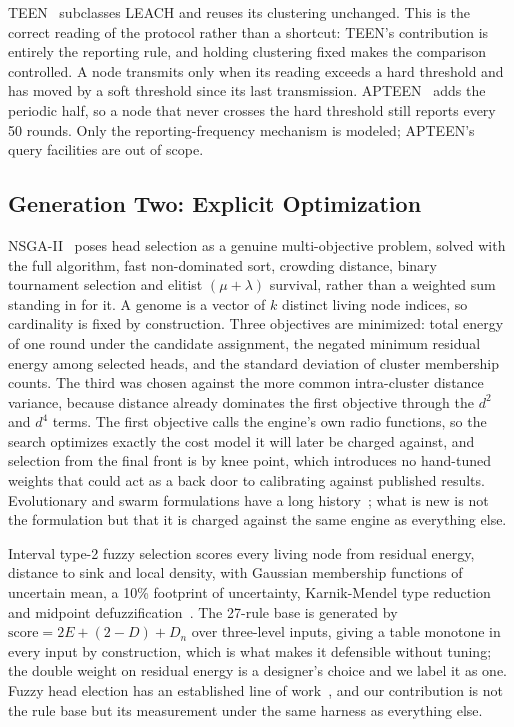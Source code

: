TEEN~\cite{manjeshwar2001teen} subclasses LEACH and reuses its clustering
unchanged. This is the correct reading of the protocol rather than a shortcut:
TEEN's contribution is entirely the reporting rule, and holding clustering fixed
makes the comparison controlled. A node transmits only when its reading exceeds
a hard threshold and has moved by a soft threshold since its last transmission.
APTEEN~\cite{manjeshwar2002apteen} adds the periodic half, so a node that never
crosses the hard threshold still reports every 50 rounds. Only the
reporting-frequency mechanism is modeled; APTEEN's query facilities are out of
scope.

\subsection{Generation Two: Explicit Optimization}

NSGA-II~\cite{deb2002nsga2} poses head selection as a genuine multi-objective
problem, solved with the full algorithm, fast non-dominated sort, crowding
distance, binary tournament selection and elitist $(\mu + \lambda)$ survival,
rather than a weighted sum standing in for it. A genome is a vector of $k$
distinct living node indices, so cardinality is fixed by construction. Three
objectives are minimized: total energy of one round under the candidate
assignment, the negated minimum residual energy among selected heads, and the
standard deviation of cluster membership counts. The third was chosen against
the more common intra-cluster distance variance, because distance already
dominates the first objective through the $d^2$ and $d^4$ terms. The first
objective calls the engine's own radio functions, so the search optimizes
exactly the cost model it will later be charged against, and selection from the
final front is by knee point, which introduces no hand-tuned weights that could
act as a back door to calibrating against published results. Evolutionary and
swarm formulations have a long history~\cite{ferentinos2007ga,kulkarni2011pso};
what is new is not the formulation but that it is charged against the same
engine as everything else.

Interval type-2 fuzzy selection scores every living node from residual energy,
distance to sink and local density, with Gaussian membership functions of
uncertain mean, a 10\% footprint of uncertainty, Karnik-Mendel type reduction
and midpoint
defuzzification~\cite{karnik2001centroid,wu2009ekm,mendel2002type2}. The 27-rule
base is generated by $\mathrm{score} = 2E + (2 - D) + D_n$ over three-level
inputs, giving a table monotone in every input by construction, which is what
makes it defensible without tuning; the double weight on residual energy is a
designer's choice and we label it as one. Fuzzy head election has an established
line of work~\cite{gupta2005fuzzy,kim2008chef,bagci2013eaucf}, and our
contribution is not the rule base but its measurement under the same harness as
everything else.

